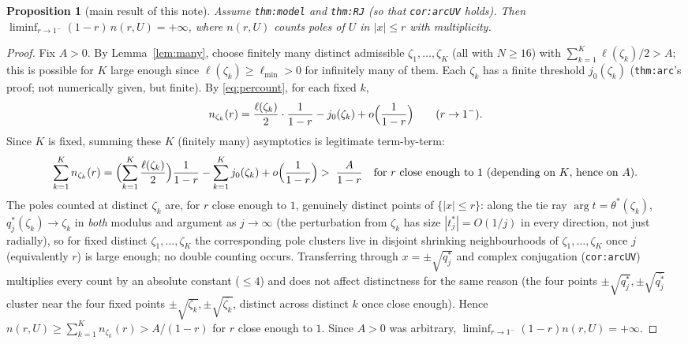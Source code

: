 \documentclass[11pt]{article}
\newtheorem{proposition}[theorem]{Proposition}
\theoremstyle{remark}
\begin{document}
\begin{proposition}[main result of this note]\label{prop:main}
Assume \texttt{thm:model} and \texttt{thm:RJ} (so that \texttt{cor:arcUV} holds). Then
$\displaystyle\liminf_{r\to1^-}(1-r)\,n(r,U)=+\infty$, where $n(r,U)$ counts poles of $U$ in
$|x|\le r$ with multiplicity.
\end{proposition}
\begin{proof}
Fix $A>0$. By Lemma~\ref{lem:many}, choose finitely many distinct admissible
$\zeta_1,\ldots,\zeta_K$ (all with $N\ge16$) with $\sum_{k=1}^K\ell(\zeta_k)/2>A$; this is possible
for $K$ large enough since $\ell(\zeta_k)\ge\ell_{\min}>0$ for infinitely many of them. Each $\zeta_k$
has a finite threshold $j_0(\zeta_k)$ (\texttt{thm:arc}'s proof; not numerically given, but finite).
By \eqref{eq:percount}, for each fixed $k$,
\[
   n_{\zeta_k}(r)=\frac{\ell(\zeta_k)}2\cdot\frac1{1-r}-j_0(\zeta_k)+o\Bigl(\frac1{1-r}\Bigr)\qquad(r\to1^-).
\]
Since $K$ is fixed, summing these $K$ (finitely many) asymptotics is legitimate term-by-term:
\[
   \sum_{k=1}^Kn_{\zeta_k}(r)=\Bigl(\sum_{k=1}^K\frac{\ell(\zeta_k)}2\Bigr)\frac1{1-r}-\sum_{k=1}^Kj_0(\zeta_k)+o\Bigl(\frac1{1-r}\Bigr)
   >\;\frac{A}{1-r}\quad\text{for $r$ close enough to $1$ (depending on $K$, hence on $A$).}
\]
The poles counted at distinct $\zeta_k$ are, for $r$ close enough to $1$, genuinely distinct points
of $\{|x|\le r\}$: along the tie ray $\arg t=\theta^\ast(\zeta_k)$, $q^\ast_j(\zeta_k)\to\zeta_k$ in
\emph{both} modulus and argument as $j\to\infty$ (the perturbation from $\zeta_k$ has size
$|t^\ast_j|=O(1/j)$ in every direction, not just radially), so for fixed distinct $\zeta_1,\ldots,\zeta_K$
the corresponding pole clusters live in disjoint shrinking neighbourhoods of $\zeta_1,\ldots,\zeta_K$
once $j$ (equivalently $r$) is large enough; no double counting occurs. Transferring through
$x=\pm\sqrt{q^\ast_j}$ and complex conjugation (\texttt{cor:arcUV}) multiplies every count by an
absolute constant ($\le4$) and does not affect distinctness for the same reason (the four points
$\pm\sqrt{q^\ast_j},\pm\sqrt{\overline{q^\ast_j}}$ cluster near the four fixed points
$\pm\sqrt{\zeta_k},\pm\sqrt{\overline{\zeta_k}}$, distinct across distinct $k$ once close enough).
Hence $n(r,U)\ge\sum_{k=1}^Kn_{\zeta_k}(r)>A/(1-r)$ for $r$ close enough to $1$. Since $A>0$ was
arbitrary, $\liminf_{r\to1^-}(1-r)n(r,U)=+\infty$.
\end{proof}
\end{document}
